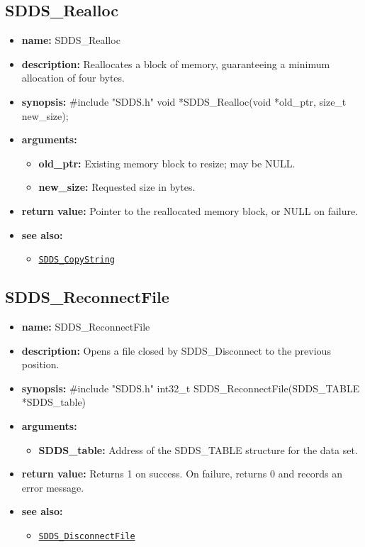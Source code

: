 \documentclass[11pt]{article}
\newcommand{\progref}[1]{\hyperref[SDDS_#1]{\tt SDDS\_#1}}
\begin{document}
\subsection{SDDS\_Realloc}
\label{SDDS_Realloc}

\begin{itemize}
\item {\bf name:}\newline
SDDS\_Realloc
\item {\bf description:}\newline
Reallocates a block of memory, guaranteeing a minimum allocation of four bytes.
\item {\bf synopsis:} \#include "SDDS.h"\newline
void *SDDS\_Realloc(void *old\_ptr, size\_t new\_size);
\item {\bf arguments:}
\begin{itemize}
\item {\bf old\_ptr:} Existing memory block to resize; may be NULL.
\item {\bf new\_size:} Requested size in bytes.
\end{itemize}
\item {\bf return value:}\newline
Pointer to the reallocated memory block, or NULL on failure.
\item {\bf see also:}
\begin{itemize}
\item \progref{CopyString}
\end{itemize}
\end{itemize}

\subsection{SDDS\_ReconnectFile}
\label{SDDS_ReconnectFile}

\begin{itemize}
\item {\bf name:}\newline
SDDS\_ReconnectFile
\item {\bf description:}\newline
Opens a file closed by SDDS\_Disconnect to the previous position.
\item {\bf synopsis:} \#include "SDDS.h"\newline
int32\_t SDDS\_ReconnectFile(SDDS\_TABLE *SDDS\_table)
\item {\bf arguments:}
\begin{itemize}
\item {\bf SDDS\_table:} Address of the SDDS\_TABLE structure for the data set.
\end{itemize}
\item {\bf return value:}\newline
Returns 1 on success. On failure, returns 0 and records an error message.
\item {\bf see also:}
\begin{itemize}
\item \progref{DisconnectFile}
\end{itemize}
\end{itemize}
\end{document}
